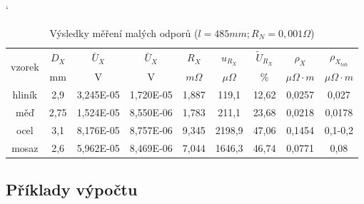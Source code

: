 \documentclass[a4paper, czech]{article}
\begin{document}
\begin{table}[H]
    \catcode`
    \centering
    \caption{Výsledky měření malých odporů ($l = 485mm; R_N = 0,001 \Omega$)}
    \begin{tabular}{ccccccccc}
        \toprule
        \multirow{2}{*}{vzorek} & $D_X$   & $\bar{U}_X$        & $\bar{U}_X$        & $R_X$    & $u_{R_X}$    & $\tilde{U}_{R_X}$   & $\rho_X$     & $\rho_{X_{tab}}$   \\
        \cmidrule{2-9}
                                & mm   & V         & V         & $m \Omega$  & $\mu \Omega$   & \%    & $\mu \Omega \cdot m$ &    $\mu \Omega \cdot m$     \\
        \midrule
        hliník                  & 2,9  & 3,245E-05 & 1,720E-05 & 1,887 & 119,1  & 12,62 & 0,0257 & 0,027   \\
        měď                     & 2,75 & 1,524E-05 & 8,550E-06 & 1,783 & 211,1  & 23,68 & 0,0218 & 0,0178  \\
        ocel                    & 3,1  & 8,176E-05 & 8,757E-06 & 9,345 & 2198,9 & 47,06 & 0,1454 & 0,1-0,2 \\
        mosaz                   & 2,6  & 5,962E-05 & 8,469E-06 & 7,044 & 1646,3 & 46,74 & 0,0771 & 0,08 \\
        \bottomrule
    \end{tabular}
\end{table}

\break

\subsection{Příklady výpočtu}
\end{document}
